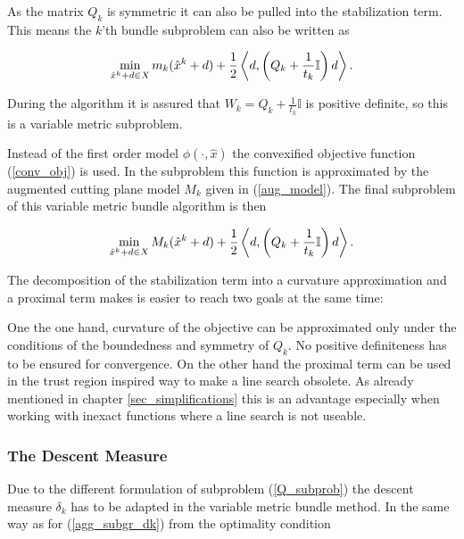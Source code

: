 As the matrix \(Q_k\) is symmetric it can also be pulled into the stabilization term. This means the \(k\)'th bundle subproblem can also be written as

\begin{equation}
	\min_{\hat{x}^k+d \in X} m_k(\hat{x}^k+d) + \frac{1}{2}\left\langle d,\left(Q_k+\frac{1}{t_k}\mathbb{I} \right) d \right\rangle.
\end{equation}

During the algorithm it is assured that \(W_k = Q_k+\frac{1}{t_k}\mathbb{I}\) is positive definite, so this is a variable metric subproblem.

Instead of the first order model \(\phi(\cdot,\hat{x})\) the convexified objective function (\ref{conv_obj}) is used. In the subproblem this function is approximated by the augmented cutting plane model \(M_k\) given in (\ref{aug_model}).
The final subproblem of this variable metric bundle algorithm is then

\begin{equation}
	\min_{\hat{x}^k+d \in X} M_k(\hat{x}^k+d) + \frac{1}{2}\left\langle d,\left(Q_k+\frac{1}{t_k}\mathbb{I} \right) d \right\rangle.
	\label{Q_subprob}
\end{equation}

The decomposition of the stabilization term into a curvature approximation and a proximal term makes is easier to reach two goals at the same time:

One the one hand, curvature of the objective can be approximated only under the conditions of the boundedness and symmetry of \(Q_k\). No positive definiteness has to be ensured for convergence.
On the other hand the proximal term can be used in the trust region inspired way to make a line search obsolete. As already mentioned in chapter \ref{sec_simplifications} this is an advantage especially when working with inexact functions where a line search is not useable.


\subsubsection{The Descent Measure}

Due to the different formulation of subproblem (\ref{Q_subprob}) the descent measure \(\delta_k\) has to be adapted in the variable metric bundle method.
In the same way as for (\ref{agg_subgr_dk}) from the optimality condition

